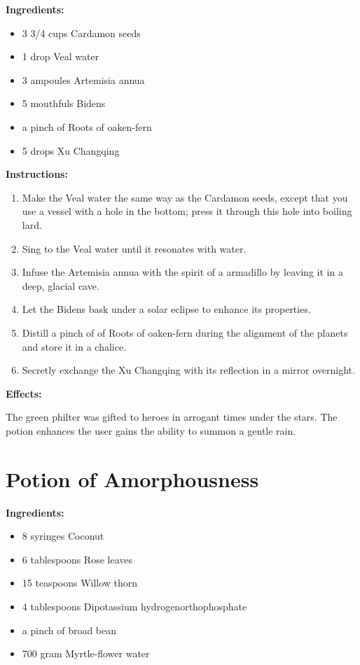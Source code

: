 \documentclass{article}
\begin{document}
\textbf{Ingredients:}

\begin{itemize}
  \item 3 3/4 cups Cardamon seeds
  \item 1 drop Veal water
  \item 3 ampoules Artemisia annua
  \item 5 mouthfuls Bidens
  \item a pinch of Roots of oaken-fern
  \item 5 drops Xu Changqing
\end{itemize}

\textbf{Instructions:}

\begin{enumerate}
  \item Make the Veal water the same way as the Cardamon seeds, except that you use a vessel with a hole in the bottom; press it through this hole into boiling lard.
  \item Sing to the Veal water until it resonates with water.
  \item Infuse the Artemisia annua with the spirit of a armadillo by leaving it in a deep, glacial cave.
  \item Let the Bidens bask under a solar eclipse to enhance its properties.
  \item Distill a pinch of of Roots of oaken-fern during the alignment of the planets and store it in a chalice.
  \item Secretly exchange the Xu Changqing with its reflection in a mirror overnight.
\end{enumerate}

\textbf{Effects:}

The green philter was gifted to heroes in arrogant times under the stars. The potion enhances the user gains the ability to summon a gentle rain.

\newpage
\section*{Potion of Amorphousness}

\textbf{Ingredients:}

\begin{itemize}
  \item 8 syringes Coconut
  \item 6 tablespoons Rose leaves
  \item 15 teaspoons Willow thorn
  \item 4 tablespoons Dipotassium hydrogenorthophosphate
  \item a pinch of broad bean
  \item 700 gram Myrtle-flower water
\end{itemize}
\end{document}
